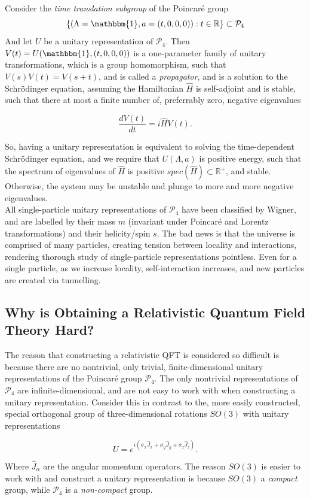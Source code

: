 \noindent Consider the \textit{time translation subgroup} of the Poincar\'e group 
\begin{equation}
\{ (\Lambda=\mathbbm{1}, a=(t, 0, 0, 0)): t \in \mathbb{R} \} \subset \mathcal{P}_4
\end{equation}
\noindent And let $U$ be a unitary representation of $\mathcal{P}_4$. Then $V(t) = U(\mathbbm{1}, (t, 0, 0, 0))$ is a one-parameter family of unitary transformations, which is a group homomorphism, such that $V(s)V(t)=V(s+t)$, and is called a \textit{propagator}, and is a solution to the Schr\"{o}dinger equation, assuming the Hamiltonian $\hat{H}$ is self-adjoint and is stable, such that there at most a finite number of, preferrably zero, negative eigenvalues

\begin{equation}
\frac{d V(t)}{dt} = i \hat{H} V(t).
\end{equation}

\noindent So, having a unitary representation is equivalent to solving the time-dependent Schr\"{o}dinger equation, and we require that $U(\Lambda, a)$ is positive energy, such that the spectrum of eigenvalues of $\hat{H}$ is positive $spec(\hat{H}) \subset \mathbb{R}^+$, and stable. Otherwise, the system may be unstable and plunge to more and more negative eigenvalues. \\

\noindent All single-particle unitary representations of $\mathcal{P}_4$ have been classified by Wigner, and are labelled by their mass $m$ (invariant under Poincar\'e and Lorentz transformations) and their helicity/spin $s$. The bad news is that the universe is comprised of many particles, creating tension between locality and interactions, rendering thorough study of single-particle representations pointless. Even for a single particle, as we increase locality, self-interaction increases, and new particles are created via tunnelling. \\

\subsection*{Why is Obtaining a Relativistic Quantum Field Theory Hard?}

\noindent The reason that constructing a relativistic QFT is considered so difficult is because there are no nontrivial, only trivial, finite-dimensional unitary representations of the Poincar\'e group $\mathcal{P}_4$. The only nontrivial representations of $\mathcal{P}_4$ are infinite-dimensional, and are not easy to work with when constructing a unitary representation. Consider this in contrast to the, more easily constructed, special orthogonal group of three-dimensional rotations $SO(3)$ with unitary representations 

\begin{equation}
U = e^{i(\sigma_x \hat{J}_x + \sigma_y \hat{J}_y + \sigma_z \hat{J}_z)}. 
\end{equation}

\noindent Where $\hat{J}_\alpha$ are the angular momentum operators. The reason $SO(3)$ is easier to work with and construct a unitary representation is because $SO(3)$ a \textit{compact} group, while $\mathcal{P}_4$ is a \textit{non-compact} group.